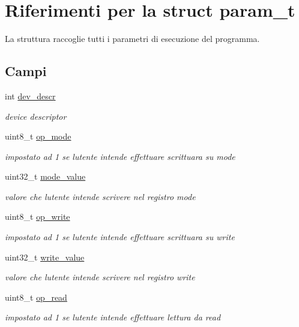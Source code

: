 \hypertarget{structparam__t}{}\section{Riferimenti per la struct param\+\_\+t}
\label{structparam__t}


La struttura raccoglie tutti i parametri di esecuzione del programma.  


\subsection*{Campi}
\begin{DoxyCompactItemize}
\item 
int \hyperlink{structparam__t_a52701f5f8091598d5c5ac1bb80cd2070}{dev\+\_\+descr}
\begin{DoxyCompactList}\small\item\em device descriptor \end{DoxyCompactList}\item 
uint8\+\_\+t \hyperlink{structparam__t_aec948fb30e99b1eda7e3d9ff741d417a}{op\+\_\+mode}
\begin{DoxyCompactList}\small\item\em impostato ad 1 se l\textquotesingle{}utente intende effettuare scrittuara su mode \end{DoxyCompactList}\item 
uint32\+\_\+t \hyperlink{structparam__t_a007b34e09ccda08824bc74ab9d86c5a8}{mode\+\_\+value}
\begin{DoxyCompactList}\small\item\em valore che l\textquotesingle{}utente intende scrivere nel registro mode \end{DoxyCompactList}\item 
uint8\+\_\+t \hyperlink{structparam__t_a67752de733f167918a4e966354183a69}{op\+\_\+write}
\begin{DoxyCompactList}\small\item\em impostato ad 1 se l\textquotesingle{}utente intende effettuare scrittuara su write \end{DoxyCompactList}\item 
uint32\+\_\+t \hyperlink{structparam__t_a09e0cff25312ab7f748a3063c038a2d9}{write\+\_\+value}
\begin{DoxyCompactList}\small\item\em valore che l\textquotesingle{}utente intende scrivere nel registro write \end{DoxyCompactList}\item 
uint8\+\_\+t \hyperlink{structparam__t_ae66d5c3154a115636a63227b7489a6eb}{op\+\_\+read}
\begin{DoxyCompactList}\small\item\em impostato ad 1 se l\textquotesingle{}utente intende effettuare lettura da read \end{DoxyCompactList}\end{DoxyCompactItemize}


